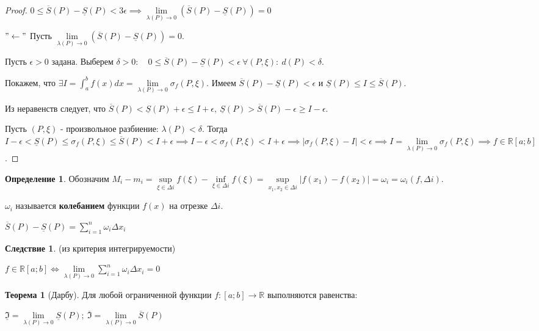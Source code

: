 \documentclass{report}
\theoremstyle{definition}
\newtheorem{definition}{Определение}[section]
\newtheorem*{effect}{Следствие}
\newtheorem{theorem}{Теорема}[section]
\begin{document}
\begin{proof}
  $0 \leqslant \overline{S}(P) - \underline{S}(P) < 3\epsilon \implies \underset{\lambda(P)\rightarrow0}{\lim}
  (\overline{S}(P) - \underline{S}(P)) = 0$

  $"\leftarrow"$ Пусть $\underset{\lambda(P)\rightarrow0}{\lim}(\overline{S}(P) - \underline{S}(P)) = 0$.

  Пусть $\epsilon > 0$ задана. Выберем $\delta > 0: \quad 0\leqslant\overline{S}(P) - \underline{S}(P) < \epsilon \
  \forall (P,\xi) : \ d(P) < \delta$.

  Покажем, что $\exists I = \int_{a}^{b} f(x)dx = \underset{\lambda(P)\rightarrow0}{\lim}\sigma_{f}(P,\xi)$.
  Имеем $\overline{S}(P) - \underline{S}(P) < \epsilon$ и $\underline{S}(P) \leqslant I \leqslant \overline{S}(P)$.

  Из неравенств следует, что $\overline{S}(P) < \underline{S}(P) + \epsilon \leqslant I + \epsilon, \ 
  \underline{S}(P) > \overline{S}(P) - \epsilon \geqslant I - \epsilon$.

  Пусть $(P,\xi)$ - произвольное разбиение: $\lambda(P) < \delta$. Тогда $I - \epsilon < \underline{S}(P)
  \leqslant \sigma_{f}(P,\xi) \leqslant \overline{S}(P) < I + \epsilon \implies I - \epsilon <
  \sigma_{f}(P,\xi) < I + \epsilon \implies | \sigma_{f}(P,\xi) - I | < \epsilon \implies I = \underset
  {\lambda(P)\rightarrow0}{\lim}\sigma_{f}(P,\xi) \implies f\in\mathbb{R} [a;b]$.
\end{proof}

\begin{definition}
  Обозначим $M_{i} - m_{i} = \underset{\xi \in \Delta i}{\sup}f(\xi) - \underset{\xi\in\Delta i}{\inf}f(\xi)
  = \underset{x_{1},x_{2}\in\Delta i}{\sup}| f(x_{1}) - f(x_{2}) | = \omega_{i} = \omega_{i}(f,\Delta i)$.

  $\omega_{i}$ называется \textbf{колебанием} функции $f(x)$ на отрезке $\Delta i$.

  $\overline{S}(P) - \underline{S}(P) = \sum_{i = 1}^{n}\omega_{i}\Delta x_{i}$
\end{definition}

\begin{effect}
  (из критерия интегрируемости)

  $f\in\mathbb{R}[a;b] \iff \underset{\lambda(P)\rightarrow0}{\lim} \sum_{i=1}^{n}\omega_{i}\Delta x_{i} = 0$
\end{effect}

\begin{theorem}[Дарбу]
  Для любой ограниченной функции $f:[a;b]\rightarrow\mathbb{R}$ выполняются равенства:

  \begin{center}
    {\large $\underline{\mathfrak{I}} = \underset{\lambda(P)\rightarrow0}{\lim}\underline{S}(P); \ \overline{\mathfrak{I}}
    = \underset{\lambda(P)\rightarrow0}{\lim}\overline{S}(P)$}
  \end{center}
\end{theorem}
\end{document}
